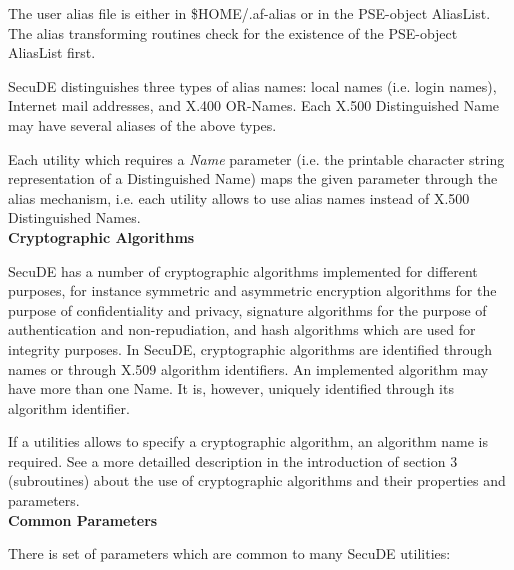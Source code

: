 The user alias file is either in \$HOME/.af-alias or in the PSE-object
AliasList. The alias transforming routines check for the existence of
the PSE-object AliasList first.
 
SecuDE distinguishes three types of alias names: local names (i.e.
login names), Internet mail addresses, and X.400 OR-Names. Each 
X.500 Distinguished Name may have several aliases of the above types.

Each utility which requires a {\em Name} parameter (i.e. the printable
character string representation of a Distinguished Name) maps the given 
parameter through the alias mechanism, i.e. each utility allows to
use alias names instead of X.500 Distinguished Names.
\\ [1em]
{\bf Cryptographic Algorithms}

SecuDE has a number of cryptographic algorithms implemented for different
purposes, for instance symmetric and asymmetric encryption algorithms
for the purpose of confidentiality and privacy, signature algorithms
for the purpose of authentication and non-repudiation, and hash
algorithms which are used for integrity purposes.
In SecuDE, cryptographic algorithms are identified through names or
through X.509 algorithm identifiers. An implemented algorithm may
have more than one Name. It is, however, uniquely identified through its
algorithm identifier. 

If a utilities allows to specify a cryptographic algorithm, an algorithm
name is required. See a more detailled description in the introduction 
of section 3 (subroutines) about the use of cryptographic algorithms
and their properties and parameters.
\\ [1em]
{\bf Common Parameters}

There is set of parameters which are common to many SecuDE utilities:
\\ [1em]



